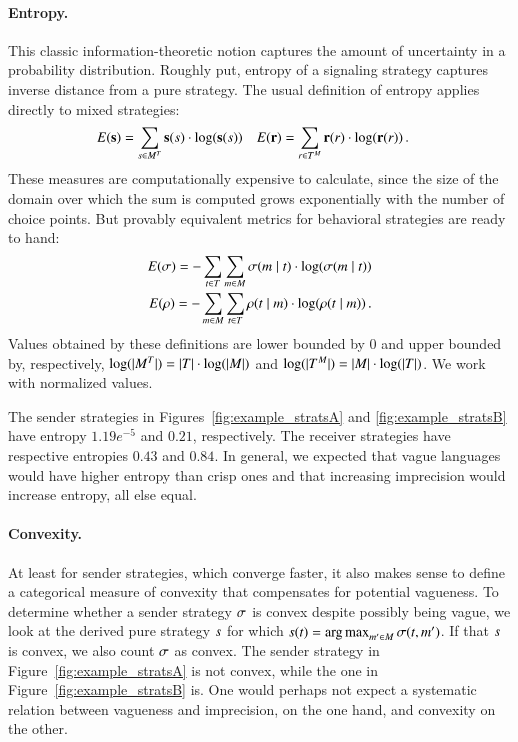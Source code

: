 \documentclass[fleqn,reqno,10pt]{article}
\renewcommand{\Smixed}{\ensuremath{\mathrm{\mathbf{s}}}}
\renewcommand{\Rmixed}{\ensuremath{\mathrm{\mathbf{r}}}}
\begin{document}
\paragraph{Entropy.} This classic information-theoretic notion
captures the amount of uncertainty in a probability
distribution. Roughly put, entropy of a signaling strategy captures
inverse distance from a pure strategy. The usual definition of entropy
applies directly to mixed strategies:
\begin{align*}
  E(\Smixed) & = \sum_{\Spure \in \Messgs^\States} \Smixed(\Spure) \cdot
  \log(\Smixed(\Spure)) & 
  E(\Rmixed) & = \sum_{\Rpure \in \States^\Messgs} \Rmixed(\Rpure) \cdot \log(\Rmixed(\Rpure)) \,.
\end{align*} 
These measures are computationally expensive to calculate, since the
size of the domain over which the sum is computed grows exponentially
with the number of choice points. But provably equivalent metrics for behavioral
strategies are ready to hand:
\begin{align*}
  E(\sigma) = -\sum_{t \in T} \sum_{m \in M}
  \sigma(m \mid t) \cdot \log(\sigma(m \mid
  t)) \\
  E(\rho) = -\sum_{m \in M} \sum_{t \in T}
  \rho(t \mid m) \cdot \log(\rho(t \mid
  m)) \,. 
\end{align*}
Values obtained by these definitions are lower bounded by $0$ and
upper bounded by, respectively, $\log(|M^T|) = |T|
\cdot \log(|M|)$ and $\log(|T^M|) = |M| \cdot
\log(|T|)$. We work with normalized values. 

The sender strategies in Figures~\ref{fig:example_stratsA} and
\ref{fig:example_stratsB} have entropy $1.19e^{-5}$ and $0.21$,
respectively. The receiver strategies have respective entropies $0.43$
and $0.84$. In general, we expected that vague languages would have
higher entropy than crisp ones and that increasing imprecision would
increase entropy, all else equal.

\paragraph{Convexity.} At least for sender strategies, which converge
faster, it also makes sense to define a categorical measure of
convexity that compensates for potential vagueness. To determine
whether a sender strategy $\sigma$ is convex despite possibly being
vague, we look at the derived pure strategy $s$ for which
$s(t) = \operatorname*{arg\,max}_{m' \in M}
\sigma(t,m')$. If that $s$ is convex, we also count
$\sigma$ as convex. The sender strategy in
Figure~\ref{fig:example_stratsA} is not convex, while the one in
Figure~\ref{fig:example_stratsB} is.  One would perhaps not expect a
systematic relation between vagueness and imprecision, on the one
hand, and convexity on the other.
\end{document}
